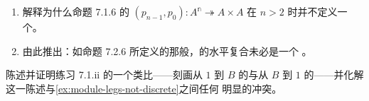 \begin{exercise}\label{ex:horizontal-composite-not-module}
\begin{enumerate}[label=(\roman*)]
\item 解释为什么命题 7.1.6 的\trTwoSidedFibration{}
$(p_{n-1},p_{0})\colon A^{\mathbb{n}}\twoheadrightarrow A\times A$ 在 $n>2$
时并不定义一个\trModule{}。
\item 由此推出：如命题 7.2.6 所定义的那般，\trModule{}的水平复合未必是一个%
\trModule{}。
\end{enumerate}
\end{exercise}

\begin{exercise}\label{ex:module-terminal-analogue}
陈述并证明练习 7.1.ii 的一个类比——刻画从 $1$ 到 $B$ 的\trModule{}与从 $B$ 到
$1$ 的\trModule——并化解这一陈述与\cref{ex:module-legs-not-discrete}之间任何
明显的冲突。
\end{exercise}


